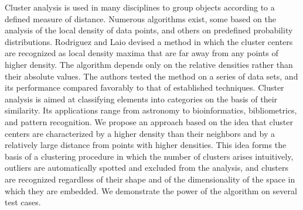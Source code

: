 Cluster analysis is used in many disciplines to group objects according to a defined measure of distance. Numerous algorithms exist, some based on the analysis of the local density of data points, and others on predefined probability distributions. Rodriguez and Laio devised a method in which the cluster centers are recognized as local density maxima that are far away from any points of higher density. The algorithm depends only on the relative densities rather than their absolute values. The authors tested the method on a series of data sets, and its performance compared favorably to that of established techniques. Cluster analysis is aimed at classifying elements into categories on the basis of their similarity. Its applications range from astronomy to bioinformatics, bibliometrics, and pattern recognition. We propose an approach based on the idea that cluster centers are characterized by a higher density than their neighbors and by a relatively large distance from points with higher densities. This idea forms the basis of a clustering procedure in which the number of clusters arises intuitively, outliers are automatically spotted and excluded from the analysis, and clusters are recognized regardless of their shape and of the dimensionality of the space in which they are embedded. We demonstrate the power of the algorithm on several test cases.

